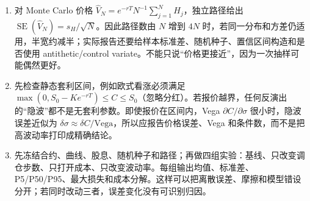 \begin{enumerate}[leftmargin=*]
  \item 对 Monte Carlo 价格 $\widehat V_N=e^{-rT}N^{-1}\sum_{j=1}^NH_j$，独立路径给出 $\operatorname{SE}(\widehat V_N)=s_H/\sqrt N$。因此路径数由 $N$ 增到 $4N$ 时，若同一分布和方差仍适用，半宽约减半；实际报告还要给样本标准差、随机种子、置信区间构造和是否使用 antithetic/control variate。不能只说“价格更接近”，因为一次抽样可能偶然更好。
  \item 先检查静态套利区间，例如欧式看涨必须满足 $\max(0,S_0-Ke^{-rT})\le C\le S_0$（忽略分红）。若报价越界，任何反演出的“隐波”都不是无套利参数。即使报价在区间内，Vega $\partial C/\partial\sigma$ 很小时，隐波误差近似为 $\delta\sigma\approx\delta C/\mathrm{Vega}$，所以应报告价格误差、Vega 和条件数，而不是把高波动率打印成精确结论。
  \item 先冻结合约、曲线、股息、随机种子和路径；再做四组实验：基线、只改变调仓步数、只打开成本、只改变波动率。每组输出均值、标准差、P5/P50/P95、最大损失和成本分解。这样可以把离散误差、摩擦和模型错设分开；若同时改动三者，误差变化没有可识别归因。
\end{enumerate}
